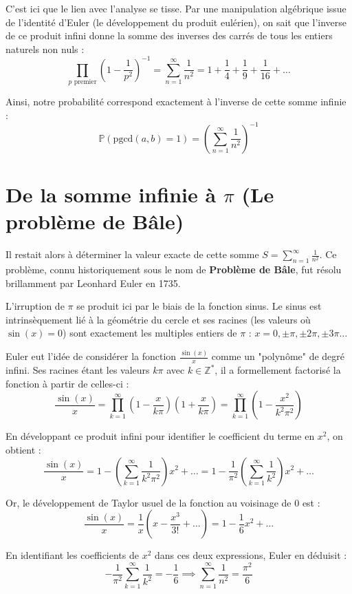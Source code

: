 \documentclass{article}
\begin{document}
C'est ici que le lien avec l'analyse se tisse. Par une manipulation algébrique issue de l'identité d'Euler (le développement du produit eulérien), on sait que l'inverse de ce produit infini donne la somme des inverses des carrés de tous les entiers naturels non nuls :
\[
\prod_{p \text{ premier}} \left( 1 - \frac{1}{p^2} \right)^{-1} = \sum_{n=1}^{\infty} \frac{1}{n^2} = 1 + \frac{1}{4} + \frac{1}{9} + \frac{1}{16} + \dots
\]

Ainsi, notre probabilité correspond exactement à l'inverse de cette somme infinie :
\[
\mathbb{P}(\text{pgcd}(a,b)=1) = \left( \sum_{n=1}^\infty \frac{1}{n^2} \right)^{-1}
\]

\section{De la somme infinie à $\pi$ (Le problème de Bâle)}

Il restait alors à déterminer la valeur exacte de cette somme $S = \sum_{n=1}^\infty \frac{1}{n^2}$.
Ce problème, connu historiquement sous le nom de \textbf{Problème de Bâle}, fut résolu brillamment par Leonhard Euler en 1735.

L'irruption de $\pi$ se produit ici par le biais de la fonction sinus. Le sinus est intrinsèquement lié à la géométrie du cercle et ses racines (les valeurs où $\sin(x) = 0$) sont exactement les multiples entiers de $\pi$ : $x = 0, \pm \pi, \pm 2\pi, \pm 3\pi \dots$

Euler eut l'idée de considérer la fonction $\frac{\sin(x)}{x}$ comme un "polynôme" de degré infini. Ses racines étant les valeurs $k\pi$ avec $k \in \mathbb{Z}^*$, il a formellement factorisé la fonction à partir de celles-ci :
\[
\frac{\sin(x)}{x} = \prod_{k=1}^\infty \left(1 - \frac{x}{k\pi}\right)\left(1 + \frac{x}{k\pi}\right) = \prod_{k=1}^\infty \left(1 - \frac{x^2}{k^2\pi^2}\right)
\]

En développant ce produit infini pour identifier le coefficient du terme en $x^2$, on obtient :
\[
\frac{\sin(x)}{x} = 1 - \left( \sum_{k=1}^\infty \frac{1}{k^2\pi^2} \right) x^2 + \dots = 1 - \frac{1}{\pi^2} \left( \sum_{k=1}^\infty \frac{1}{k^2} \right) x^2 + \dots
\]

Or, le développement de Taylor usuel de la fonction au voisinage de 0 est :
\[
\frac{\sin(x)}{x} = \frac{1}{x} \left( x - \frac{x^3}{3!} + \dots \right) = 1 - \frac{1}{6} x^2 + \dots
\]

En identifiant les coefficients de $x^2$ dans ces deux expressions, Euler en déduisit :
\[
-\frac{1}{\pi^2} \sum_{k=1}^\infty \frac{1}{k^2} = -\frac{1}{6} \implies \sum_{n=1}^{\infty} \frac{1}{n^2} = \frac{\pi^2}{6}
\]
\end{document}
